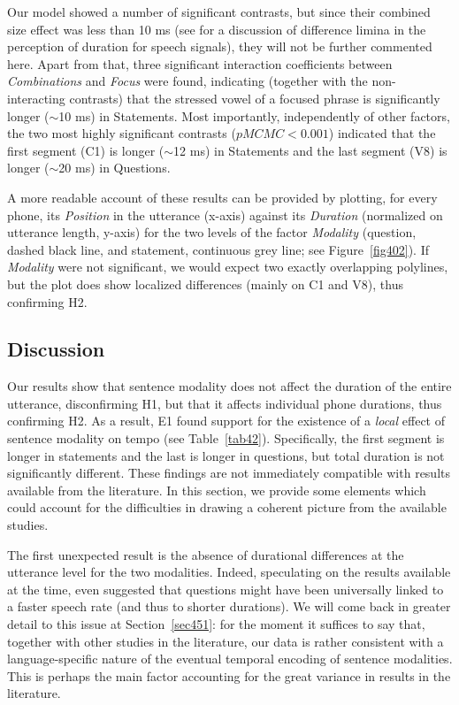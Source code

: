 Our model showed a number of significant contrasts, but since their combined size effect was less than 10 ms (see \citealt{lehiste1970suprasegmentals} for a discussion of difference limina in the perception of duration for speech signals), they will not be further commented here. Apart from that, three significant interaction coefficients between \textit{Combinations} and \textit{Focus} were found, indicating (together with the non-interacting contrasts) that the stressed vowel of a focused phrase is significantly longer ($ \sim $10 ms) in Statements. Most importantly, independently of other factors, the two most highly significant contrasts ($pMCMC<0.001$) indicated that the first segment (C1) is longer ($ \sim $12 ms) in Statements and the last segment (V8) is longer ($ \sim $20 ms) in Questions.

A more readable account of these results can be provided by plotting, for every phone, its \textit{Position} in the utterance (x-axis) against its \textit{Duration} (normalized on utterance length, y-axis) for the two levels of the factor \textit{Modality} (question, dashed black line, and statement, continuous grey line; see Figure~\ref{fig402}). If \textit{Modality} were not significant, we would expect two exactly overlapping polylines, but the plot does show localized differences (mainly on C1 and V8), thus confirming H2.

\subsection{Discussion}\label{sec434}
Our results show that sentence modality does not affect the duration of the entire utterance, disconfirming H1, but that it affects individual phone durations, thus confirming H2. As a result, E1 found support for the existence of a \textit{local} effect of sentence modality on tempo (see Table~\ref{tab42}). Specifically, the first segment is longer in statements and the last is longer in questions, but total duration is not significantly different. These findings are not immediately compatible with results available from the literature. In this section, we provide some elements which could account for the difficulties in drawing a coherent picture from the available studies. 

The first unexpected result is the absence of durational differences at the utterance level for the two modalities. Indeed, speculating on the results available at the time, \citet{vanheuven2005speech} even suggested that questions might have been universally linked to a faster speech rate (and thus to shorter durations). We will come back in greater detail to this issue at Section~\ref{sec451}: for the moment it suffices to say that, together with other studies in the literature, our data is rather consistent with a language-specific nature of the eventual temporal encoding of sentence modalities. This is perhaps the main factor accounting for the great variance in results in the literature.

